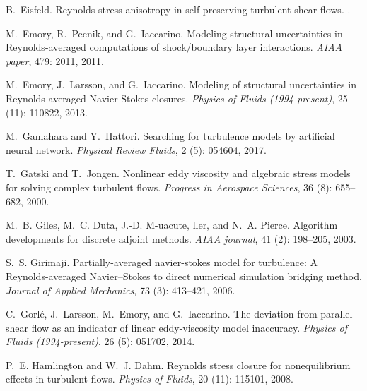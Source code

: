 \documentclass[a4paper]{ar-1col}
\begin{document}
\begin{thebibliography}{82}
B.~Eisfeld.
\newblock Reynolds stress anisotropy in self-preserving turbulent shear flows.
.

M.~Emory, R.~Pecnik, and G.~Iaccarino.
\newblock Modeling structural uncertainties in {Reynolds}-averaged computations
  of shock/boundary layer interactions.
\newblock \emph{AIAA paper}, 479: 2011, 2011.

M.~Emory, J.~Larsson, and G.~Iaccarino.
\newblock Modeling of structural uncertainties in {Reynolds-averaged
  Navier-Stokes} closures.
\newblock \emph{Physics of Fluids (1994-present)}, 25 (11):
  110822, 2013.

M.~Gamahara and Y.~Hattori.
\newblock Searching for turbulence models by artificial neural network.
\newblock \emph{Physical Review Fluids}, 2 (5): 054604, 2017.

T.~Gatski and T.~Jongen.
\newblock Nonlinear eddy viscosity and algebraic stress models for solving
  complex turbulent flows.
\newblock \emph{Progress in Aerospace Sciences}, 36 (8):
  655--682, 2000.

M.~B. Giles, M.~C. Duta, J.-D. M-uacute, ller, and N.~A. Pierce.
\newblock Algorithm developments for discrete adjoint methods.
\newblock \emph{AIAA journal}, 41 (2): 198--205, 2003.

S.~S. Girimaji.
\newblock Partially-averaged navier-stokes model for turbulence: A
  {R}eynolds-averaged {N}avier--{S}tokes to direct numerical simulation
  bridging method.
\newblock \emph{Journal of Applied Mechanics}, 73 (3):
  413--421, 2006.

C.~Gorl{\'e}, J.~Larsson, M.~Emory, and G.~Iaccarino.
\newblock The deviation from parallel shear flow as an indicator of linear
  eddy-viscosity model inaccuracy.
\newblock \emph{Physics of Fluids (1994-present)}, 26 (5):
  051702, 2014.

P.~E. Hamlington and W.~J. Dahm.
\newblock Reynolds stress closure for nonequilibrium effects in turbulent
  flows.
\newblock \emph{Physics of Fluids}, 20 (11): 115101, 2008.


\end{thebibliography}
\end{document}
